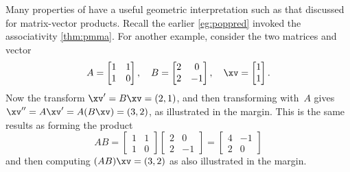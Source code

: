 \begin{example}
Many properties of  have a useful geometric interpretation such as that discussed for matrix-vector products.
Recall the earlier \autoref{eg:poppred} invoked the associativity \autoref{thm:pmma}.
For another example, consider the two matrices and vector
\begin{equation*}
A=\begin{bmatrix} 1&1\\1&0 \end{bmatrix},\quad
B=\begin{bmatrix} 2&0\\2&-1 \end{bmatrix},\quad
\xv=\begin{bmatrix} 1\\1 \end{bmatrix}.
\end{equation*}
%
Now the transform \(\xv'=B\xv=(2,1)\), and then transforming with~\(A\) gives \(\xv''=A\xv'=A(B\xv)=(3,2)\), as illustrated in the margin.
This is the same results as forming the product
\begin{equation*}
AB=\begin{bmatrix} 1&1\\1&0 \end{bmatrix} 
\begin{bmatrix} 2&0\\2&-1 \end{bmatrix}
=\begin{bmatrix} 4&-1\\2&0 \end{bmatrix}
\end{equation*}
and then computing \((AB)\xv=(3,2)\) as also illustrated in the margin.
\marginpar{\begin{tikzpicture}
\begin{axis}[footnotesize,width=12em
    , axis equal image, axis lines=middle,
    , grid,xmin=0,xmax=3.9,ymax=2.9 ]

\end{axis}
\end{tikzpicture}}
\end{example}
